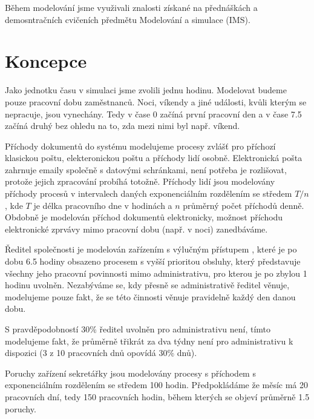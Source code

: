 \documentclass[12pt,a4paper]{article}
\begin{document}
Během modelování jsme využivali znalosti získané na přednáškách a demosntračních cvičeních předmětu Modelování a simulace (IMS).

\newpage

\section{Koncepce}

Jako jednotku času v simulaci jsme zvolili jednu hodinu.
Modelovat \cite{ims-zakladni-pojmy} budeme pouze pracovní dobu zaměstnanců. Noci, víkendy a jiné události, kvůli kterým se nepracuje, jsou vynechány.
Tedy v čase 0 začíná první pracovní den a v čase 7.5 začíná druhý bez ohledu na to, zda mezi nimi byl např. víkend.

Příchody dokumentů do systému modelujeme procesy zvlášť pro příchozí klasickou poštu, elekteronickou poštu a příchody lidí osobně.
Elektronická pošta zahrnuje emaily společně s datovými schránkami, není potřeba je rozlišovat, protože jejich zpracování probíhá totožně.
Příchody lidí jsou modelovány příchody procesů v intervalech daných exponenciálním rozdělením se středem $T/n$ \cite{ims-rozlozeni}, kde $T$ je délka pracovního dne v ho\-di\-nách a $n$ průměrný počet příchodů denně.
Obdobně je modelován příchod dokumentů elektronicky, možnost příchodu elektronické zprvávy mimo pracovní dobu (např. v noci) zanedbáváme.

Ředitel společnosti je modelován zařízením s výlučným přístupem \cite{ims-zarizeni}, které je po dobu 6.5 hodiny obsazeno procesem s vyšší prioritou obsluhy,
který představuje všechny jeho pracovní povinnosti mimo administrativu, pro kterou je po zbylou 1 hodinu uvolněn.
Ne\-za\-bý\-vá\-me se, kdy přesně se administrativě ředitel věnuje, modelujeme pouze fakt, že se této činnosti věnuje pravidelně každý den danou dobu.

S pravděpodobností 30\% ředitel uvolněn pro administrativu není, tímto modelujeme fakt, že průměrně třikrát za dva týdny není pro administrativu k dispozici (3 z 10 pracovních dnů opovídá 30\% dnů).

Poruchy zařízení sekretářky jsou modelovány procesy s příchodem s exponenciálním rozdělením se středem 100 hodin. Předpokládáme že měsíc má 20 pracovních dní, tedy 150 pracovních hodin, během kterých se objeví průměrně 1.5 poruchy.

\end{document}
